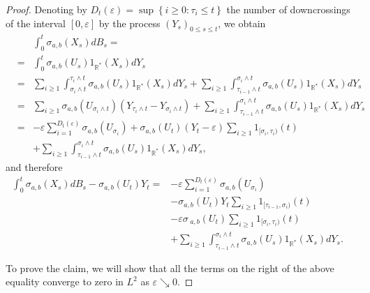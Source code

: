 \documentclass[reqno]{amsart}
\theoremstyle{definition}
\theoremstyle{remark}
\numberwithin{equation}{section}
\begin{document}
\begin{proof}
Denoting by $D_{t}\left( \varepsilon \right) =\sup \left\{ i\geq 0:\tau
_{i}\leq t \right\} $ the number of downcrossings of the interval $\left[
0,\varepsilon \right] $ by the process $(Y_{s})_{0\leq s\leq t}$, we obtain
\begin{eqnarray*}
&&\int_{0}^{t}\sigma _{a,b}\left( X_{s}\right) dB_{s} =\\
&=&\int_{0}^{t}\sigma
_{a,b}\left( U_{s}\right) 1_{\mathbb{R}^{\ast }}( X_{s}) dY_{s} \\
&=&\sum_{i\geq 1}\int_{\sigma _{i}\wedge t}^{\tau _{i}\wedge t}\sigma
_{a,b}\left( U_{s}\right) 1_{\mathbb{R}^{\ast }}( X_{s})
dY_{s}+\sum_{i\geq 1}\int_{\tau _{i-1}\wedge t}^{\sigma _{i}\wedge t}\sigma
_{a,b}\left( U_{s}\right) 1_{\mathbb{R}^{\ast}}( X_{s}) dY_{s} \\
&=&\sum_{i\geq 1}\sigma _{a,b}\left( U_{\sigma _{i}\wedge t}\right) \left(
Y_{\tau _{i}\wedge t}-Y_{\sigma _{i}\wedge t}\right) +\sum_{i\geq
1}\int_{\tau _{i-1}\wedge t}^{\sigma _{i}\wedge t}\sigma _{a,b}\left(
U_{s}\right) 1_{\mathbb{R}^{\ast}}( X_{s}) dY_{s} \\
&=&-\varepsilon \sum_{i=1}^{D_{t}\left( \varepsilon \right) }\sigma
_{a,b}\left( U_{\sigma _{i}}\right) +\sigma _{a,b}\left( U_{t}\right) \left(
Y_{t}-\varepsilon \right) \sum_{i\geq 1}1_{[\sigma _{i},\tau _{i})}\left(
t\right)\\
&&+\sum_{i\geq 1}\int_{\tau _{i-1}\wedge t}^{\sigma _{i}\wedge
t}\sigma _{a,b}\left( U_{s}\right) 1_{\mathbb{R}^{\ast }}\left( X_{s}\right) dY_{s},
\end{eqnarray*}and therefore\begin{align}
\int_0^t \sigma_{a,b} \left( X_{s}\right) d B_{s}-\sigma _{a,b}\left(
U_{t}\right) Y_{t} =&-\varepsilon \sum_{i=1}^{D_{t}\left( \varepsilon
\right) }\sigma _{a,b}\left( U_{\sigma _{i}}\right) \label{aux2} \\
&-\sigma _{a,b}\left(
U_{t}\right) Y_{t}\sum_{i\geq 1}1_{[\tau _{i-1},\sigma _{i})}\left( t\right)& \nonumber\\
&-\varepsilon \sigma \,_{a,b}\left( U_{t}\right) \sum_{i\geq 1}1_{[\sigma
_{i},\tau _{i})}\left( t\right)& \nonumber\\
&+\sum_{i\geq 1}\int_{\tau _{i-1}\wedge
t}^{\sigma _{i}\wedge t}\sigma _{a,b}\left( U_{s}\right) 1_{\mathbb{R}^{\ast }}\left(
X_{s}\right) dY_{s}.&  \nonumber
\end{align}

To prove the claim, we will show that all the terms on the right of the above
equality converge to zero in $L^{2}$ as $\varepsilon \searrow 0$.


\end{proof}
\end{document}
